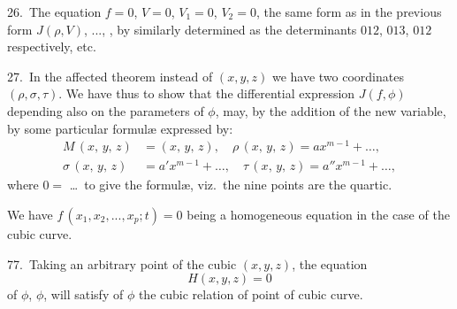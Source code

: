 \documentclass[11pt,a4paper]{article}
\theoremstyle{plain}
\theoremstyle{definition}
\theoremstyle{remark}
\begin{document}
26.\ The equation $f = 0$, $V = 0$, $V_1 = 0$, $V_2 = 0$, the same form as in the previous form $J(\rho, V)$, ..., , by similarly determined as the determinants $012$, $013$, $012$ respectively, etc.

\bigskip

27.\ In the affected theorem instead of $(x, y, z)$ we have two coordinates $(\rho, \sigma, \tau)$. We have thus to show that the differential expression $J(f, \phi)$ depending also on the parameters of $\phi$, may, by the addition of the new variable, by some particular formul\ae{} expressed by:
\begin{align*}
M\,(x,\,y,\,z) &= (x,\,y,\,z),\quad \rho\,(x,\,y,\,z) = a x^{m-1} + \ldots,\\
\sigma\,(x,\,y,\,z) &= a' x^{m-1} + \ldots,\quad \tau\,(x,\,y,\,z) = a'' x^{m-1} + \ldots,
\end{align*}
where $0 = $ \dots\ to give the formul\ae{}, viz.\ the nine points are the quartic.

We have $f\,(x_1, x_2, ..., x_p; t) = 0$ being a homogeneous equation in the case of the cubic curve.

77.\ Taking an arbitrary point of the cubic $(x, y, z)$, the equation
\[
H(x, y, z) = 0
\]
of $\phi$, $\phi$, will satisfy of $\phi$ the cubic relation of point of cubic curve.

\bigskip
\end{document}
